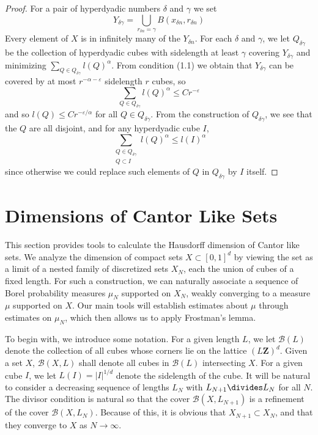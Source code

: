 \begin{proof}
    For a pair of hyperdyadic numbers $\delta$ and $\gamma$ we set
    \[ Y_{\delta \gamma} = \bigcup_{r_{\delta n} = \gamma} B(x_{\delta n}, r_{\delta n}) \]
    Every element of $X$ is in infinitely many of the $Y_{\delta n}$. For each $\delta$ and $\gamma$, we let $Q_{\delta \gamma}$ be the collection of hyperdyadic cubes with sidelength at least $\gamma$ covering $Y_{\delta \gamma}$ and minimizing $\sum_{Q \in Q_{\delta \gamma}} l(Q)^\alpha$. From condition (1.1) we obtain that $Y_{\delta \gamma}$ can be covered by at most $r^{-\alpha - \varepsilon}$ sidelength $r$ cubes, so
    \[ \sum_{Q \in Q_{\delta \gamma}} l(Q)^\alpha \leq Cr^{-\varepsilon} \]
    and so $l(Q) \leq Cr^{-\varepsilon/\alpha}$ for all $Q \in Q_{\delta \gamma}$. From the construction of $Q_{\delta \gamma}$, we see that the $Q$ are all disjoint, and for any hyperdyadic cube $I$,
    \[ \sum_{\substack{Q \in Q_{\delta \gamma}\\Q \subset I}} l(Q)^\alpha \leq l(I)^\alpha \]
    since otherwise we could replace such elements of $Q$ in $Q_{\delta \gamma}$ by $I$ itself.
\end{proof}

\section{Dimensions of Cantor Like Sets}

This section provides tools to calculate the Hausdorff dimension of Cantor like sets. We analyze the dimension of compact sets $X \subset [0,1]^d$ by viewing the set as a limit of a nested family of discretized sets $X_N$, each the union of cubes of a fixed length. For such a construction, we can naturally associate a sequence of Borel probability measures $\mu_N$ supported on $X_N$, weakly converging to a measure $\mu$ supported on $X$. Our main tools will establish estimates about $\mu$ through estimates on $\mu_N$, which then allows us to apply Frostman's lemma.

To begin with, we introduce some notation. For a given length $L$, we let $\mathcal{B}(L)$ denote the collection of all cubes whose corners lie on the lattice $(L \mathbf{Z})^d$. Given a set $X$, $\mathcal{B}(X,L)$ shall denote all cubes in $\mathcal{B}(L)$ intersecting $X$. For a given cube $I$, we let $L(I) = |I|^{1/d}$ denote the sidelength of the cube. It will be natural to consider a decreasing sequence of lengths $L_N$ with $L_{N+1} \divides L_N$ for all $N$. The divisor condition is natural so that the cover $\mathcal{B}(X,L_{N+1})$ is a refinement of the cover $\mathcal{B}(X,L_N)$. Because of this, it is obvious that $X_{N+1} \subset X_N$, and that they converge to $X$ as $N \to \infty$.

